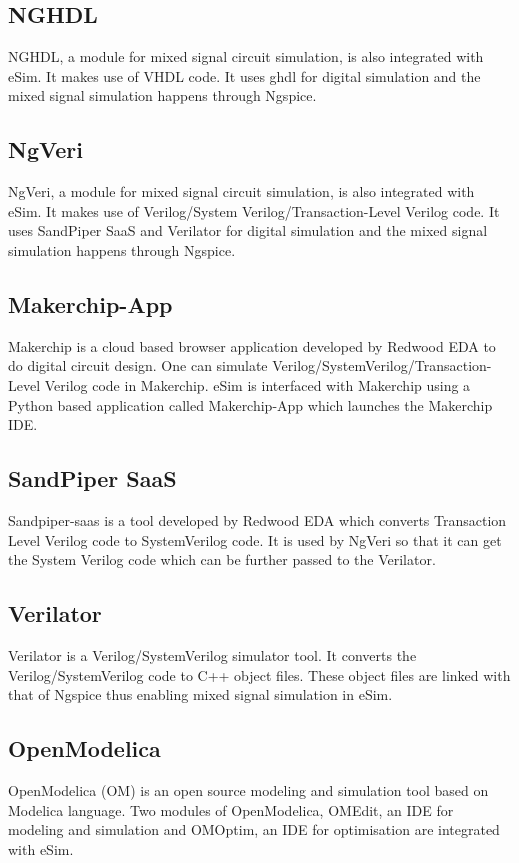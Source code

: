 \subsection{NGHDL}  \label{sec:nghdl}
NGHDL, a module for mixed signal circuit simulation, is also integrated with eSim.  It makes use of VHDL code.
It uses ghdl for digital simulation and the mixed signal simulation happens through 
Ngspice.

\subsection{NgVeri}  \label{sec:NgVeri}
NgVeri, a module for mixed signal circuit simulation, is also integrated with eSim. It makes use of Verilog/System Verilog/Transaction-Level Verilog  code.
It uses SandPiper SaaS and Verilator for digital simulation and the mixed signal simulation happens through 
Ngspice. 

\subsection{Makerchip-App}  \label{sec:Makerchip-App}
Makerchip is a cloud based browser application developed by Redwood EDA to do digital circuit design. One can simulate Verilog/SystemVerilog/Transaction-Level Verilog code in Makerchip. eSim is interfaced with Makerchip using a Python based application called Makerchip-App which launches the Makerchip IDE.

\subsection{SandPiper SaaS}  \label{sec:Sandpiper-saas}
Sandpiper-saas is a tool developed by Redwood EDA which converts Transaction Level Verilog code to SystemVerilog code. It is used by NgVeri so that it can get the System Verilog code which can be further passed to the Verilator.

\subsection{Verilator}  \label{sec:Verilator}
Verilator is a Verilog/SystemVerilog simulator tool. It converts the Verilog/SystemVerilog code to C++ object files. These object files are linked with that of Ngspice thus enabling mixed signal simulation in eSim.

\subsection{OpenModelica}  \label{sec:openmodelica}
OpenModelica (OM) is an open source modeling and simulation tool based on
Modelica language. Two modules of OpenModelica, OMEdit, an IDE for modeling 
and simulation and OMOptim, an IDE for optimisation are integrated with eSim.

